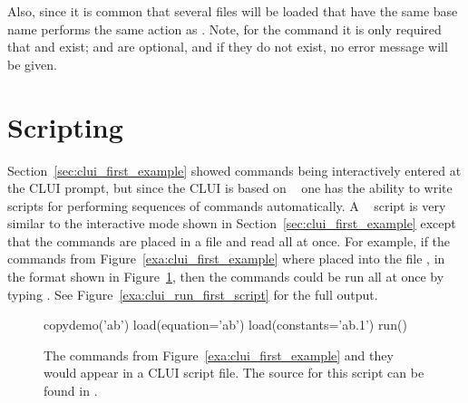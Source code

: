 Also, since it is common that several files will be loaded that
have the same base name  performs the same 
action as .  Note, 
for the command  it is only required that 
 and  exist;   and
 are optional, and if they do not exist,
no error message will be given.  


\section{ Scripting }

Section~\ref{sec:clui_first_example} showed commands
being interactively entered at the \AUTOc CLUI
prompt, but since the \AUTOc CLUI is based 
on \python~ one has the ability to write
scripts for performing sequences of commands
automatically.  A \python~ script is very similar
to the interactive mode shown in Section~\ref{sec:clui_first_example}
except that the commands are placed in a file and
read all at once.  For example, if the
commands from Figure~\ref{exa:clui_first_example} where placed 
into the file , in the format shown in 
Figure~\ref{exa:clui_first_script}, then the commands
could be run all at once by typing .
See Figure~\ref{exa:clui_run_first_script} for the
full output.

\begin{figure}[htb]
{\small \begin{center} \begin{boxedverbatim}
copydemo('ab')
load(equation='ab')
load(constants='ab.1')
run()
\end{boxedverbatim}
\end{center} 
}
\caption[First example of a \AUTOc CLUI script.]
{The commands from Figure~\ref{exa:clui_first_example}
and they would appear in a \AUTOc CLUI script file.
The source for this script can be found in .
}
\label{exa:clui_first_script}
\end{figure}


